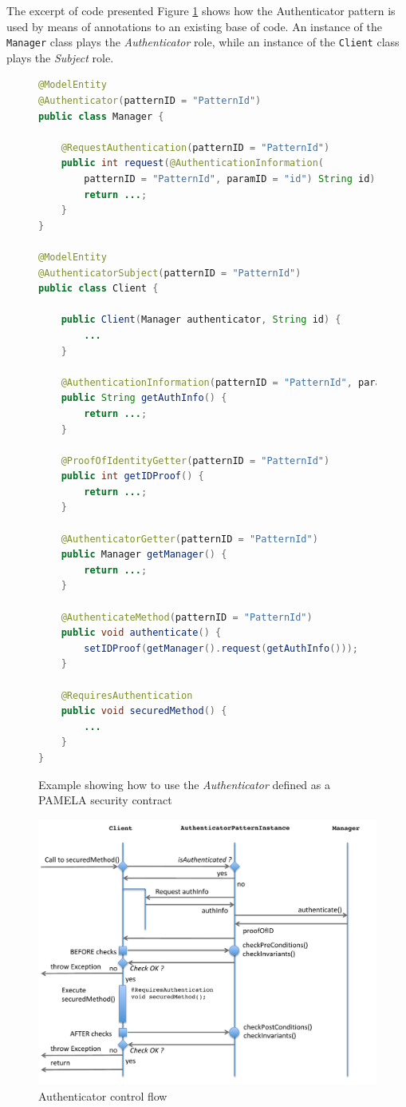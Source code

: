 The excerpt of code presented Figure \ref{fig:ExampleOfAuthenticatorPattern} shows how the Authenticator pattern is used by means of annotations to an existing base of code. An instance of the \texttt{Manager} class plays the \emph{Authenticator} role, while an instance of the \texttt{Client} class plays the \emph{Subject} role.

\begin{figure}
    \centering
\begin{lstlisting}[language=Java,basicstyle=\ttfamily\footnotesize]
@ModelEntity 
@Authenticator(patternID = "PatternId")
public class Manager {

	@RequestAuthentication(patternID = "PatternId")
	public int request(@AuthenticationInformation(
        patternID = "PatternId", paramID = "id") String id) {
		return ...;
	}
}

@ModelEntity
@AuthenticatorSubject(patternID = "PatternId")
public class Client {

	public Client(Manager authenticator, String id) {
		...
	}

	@AuthenticationInformation(patternID = "PatternId", paramID = "id")
	public String getAuthInfo() {
		return ...;
	}

	@ProofOfIdentityGetter(patternID = "PatternId")
	public int getIDProof() {
		return ...;
	}

	@AuthenticatorGetter(patternID = "PatternId")
	public Manager getManager() {
		return ...;
	}

	@AuthenticateMethod(patternID = "PatternId")
	public void authenticate() {
		setIDProof(getManager().request(getAuthInfo()));
	}

	@RequiresAuthentication
	public void securedMethod() {
		...
	}
}
\end{lstlisting}
    \caption{Example showing how to use the \textit{Authenticator} defined as a PAMELA security contract}
    \label{fig:ExampleOfAuthenticatorPattern}
\end{figure}

\begin{figure}
    \centering
    \includegraphics[width=1.0 \columnwidth]{figures/AuthenticatorControlFlow.pdf}
    \caption{Authenticator control flow}
    \label{fig:AuthenticatorControlFlow}
\end{figure}


